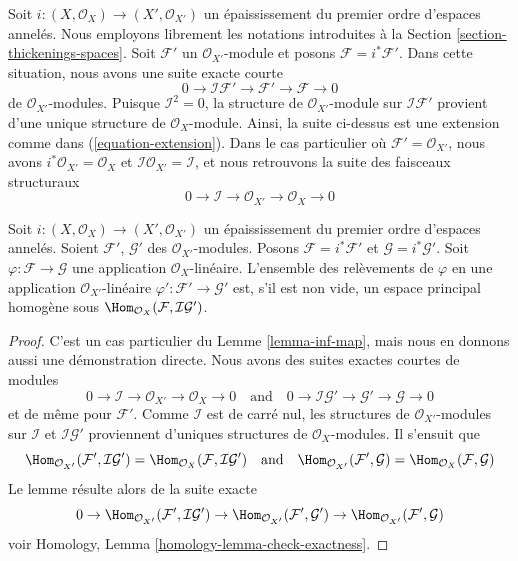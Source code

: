 \noindent
Soit $i : (X, \mathcal{O}_X) \to (X', \mathcal{O}_{X'})$ un épaississement
du premier ordre d'espaces annelés. Nous employons librement les notations introduites à la
Section \ref{section-thickenings-spaces}.
Soit $\mathcal{F}'$ un $\mathcal{O}_{X'}$-module
et posons $\mathcal{F} = i^*\mathcal{F}'$.
Dans cette situation, nous avons une suite exacte courte
$$
0 \to \mathcal{I}\mathcal{F}' \to \mathcal{F}' \to \mathcal{F} \to 0
$$
de $\mathcal{O}_{X'}$-modules. Puisque $\mathcal{I}^2 = 0$, la structure de
$\mathcal{O}_{X'}$-module sur $\mathcal{I}\mathcal{F}'$
provient d'une unique structure de $\mathcal{O}_X$-module.
Ainsi, la suite ci-dessus est une extension comme dans (\ref{equation-extension}).
Dans le cas particulier où $\mathcal{F}' = \mathcal{O}_{X'}$, nous avons
$i^*\mathcal{O}_{X'} = \mathcal{O}_X$ et
$\mathcal{I}\mathcal{O}_{X'} = \mathcal{I}$, et nous retrouvons la
suite des faisceaux structuraux
$$
0 \to \mathcal{I} \to \mathcal{O}_{X'} \to \mathcal{O}_X \to 0
$$

\begin{lemma}
\label{lemma-inf-map-special}
Soit $i : (X, \mathcal{O}_X) \to (X', \mathcal{O}_{X'})$
un épaississement du premier ordre d'espaces annelés.
Soient $\mathcal{F}'$, $\mathcal{G}'$ des $\mathcal{O}_{X'}$-modules.
Posons $\mathcal{F} = i^*\mathcal{F}'$ et $\mathcal{G} = i^*\mathcal{G}'$.
Soit $\varphi : \mathcal{F} \to \mathcal{G}$ une application
$\mathcal{O}_X$-linéaire.
L'ensemble des relèvements de $\varphi$ en une application
$\mathcal{O}_{X'}$-linéaire
$\varphi' : \mathcal{F}' \to \mathcal{G}'$ est, s'il est non vide, un espace
principal homogène sous
$\Hom_{\mathcal{O}_X}(\mathcal{F}, \mathcal{I}\mathcal{G}')$.
\end{lemma}

\begin{proof}
C'est un cas particulier du Lemme \ref{lemma-inf-map}, mais nous en donnons
aussi une démonstration directe. Nous avons des suites exactes courtes de modules
$$
0 \to \mathcal{I} \to \mathcal{O}_{X'} \to \mathcal{O}_X \to 0
\quad\text{and}\quad
0 \to \mathcal{I}\mathcal{G}' \to \mathcal{G}' \to \mathcal{G} \to 0
$$
et de même pour $\mathcal{F}'$.
Comme $\mathcal{I}$ est de carré nul, les structures de
$\mathcal{O}_{X'}$-modules sur $\mathcal{I}$ et
$\mathcal{I}\mathcal{G}'$ proviennent d'uniques structures de
$\mathcal{O}_X$-modules. Il s'ensuit que
$$
\Hom_{\mathcal{O}_{X'}}(\mathcal{F}', \mathcal{I}\mathcal{G}') =
\Hom_{\mathcal{O}_X}(\mathcal{F}, \mathcal{I}\mathcal{G}')
\quad\text{and}\quad
\Hom_{\mathcal{O}_{X'}}(\mathcal{F}', \mathcal{G}) =
\Hom_{\mathcal{O}_X}(\mathcal{F}, \mathcal{G})
$$
Le lemme résulte alors de la suite exacte
$$
0 \to \Hom_{\mathcal{O}_{X'}}(\mathcal{F}', \mathcal{I}\mathcal{G}') \to
\Hom_{\mathcal{O}_{X'}}(\mathcal{F}', \mathcal{G}') \to
\Hom_{\mathcal{O}_{X'}}(\mathcal{F}', \mathcal{G})
$$
voir Homology, Lemma \ref{homology-lemma-check-exactness}.
\end{proof}

